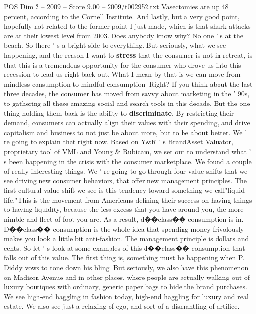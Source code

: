 \begin{textsample}{POS Dim 2 – 2009 – Score 9.00 – 2009/t002952.txt}
Vasectomies are up 48 percent, according to the Cornell Institute.
And lastly, but a very good point, hopefully not related to the former point I just made, which is that shark attacks are at their lowest level from 2003.
Does anybody know why?
No one ' s at the beach.
So there ' s a bright side to everything.
But seriously, what we see happening, and the reason I want to \textbf{stress} that the consumer is not in retreat, is that this is a tremendous opportunity for the consumer who drove us into this recession to lead us right back out.
What I mean by that is we can move from mindless consumption to mindful consumption.
Right?
If you think about the last three decades, the consumer has moved from savvy about marketing in the ' 90s, to gathering all these amazing social and search tools in this decade.
But the one thing holding them back is the ability to \textbf{discriminate}.
By restricting their demand, consumers can actually align their values with their spending, and drive capitalism and business to not just be about more, but to be about better.
We ' re going to explain that right now.
Based on Y\&R ' s BrandAsset Valuator, proprietary tool of VML and Young \& Rubicam, we set out to understand what ' s been happening in the crisis with the consumer marketplace.
We found a couple of really interesting things.
We ' re going to go through four value shifts that we see driving new consumer behaviors, that offer new management principles.
The first cultural value shift we see is this tendency toward something we call"liquid life."This is the movement from Americans defining their success on having things to having liquidity, because the less excess that you have around you, the more nimble and fleet of foot you are.
As a result, d{\EmojiFont �}{\EmojiFont �}class{\EmojiFont �}{\EmojiFont �} consumption is in.
D{\EmojiFont �}{\EmojiFont �}class{\EmojiFont �}{\EmojiFont �} consumption is the whole idea that spending money frivolously makes you look a little bit anti-fashion.
The management principle is dollars and cents.
So let ' s look at some examples of this d{\EmojiFont �}{\EmojiFont �}class{\EmojiFont �}{\EmojiFont �} consumption that falls out of this value.
The first thing is, something must be happening when P.
Diddy vows to tone down his bling.
But seriously, we also have this phenomenon on Madison Avenue and in other places, where people are actually walking out of luxury boutiques with ordinary, generic paper bags to hide the brand purchases.
We see high-end haggling in fashion today, high-end haggling for luxury and real estate.
We also see just a relaxing of ego, and sort of a dismantling of artifice.

\end{textsample}
